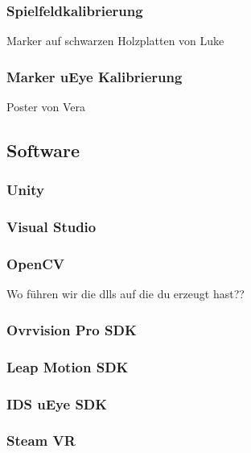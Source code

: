 \subsubsection{Spielfeldkalibrierung}
Marker auf schwarzen Holzplatten von Luke

\subsubsection{Marker uEye Kalibrierung}
Poster von Vera

\subsection{Software}
\subsubsection{Unity \label{unity}} 
\subsubsection{Visual Studio} 
\subsubsection{OpenCV} 
Wo führen wir die dlls auf die du erzeugt hast??
\subsubsection{Ovrvision Pro SDK} 
\subsubsection{Leap Motion SDK} 
\subsubsection{IDS uEye SDK}
\subsubsection{Steam VR}


\newpage